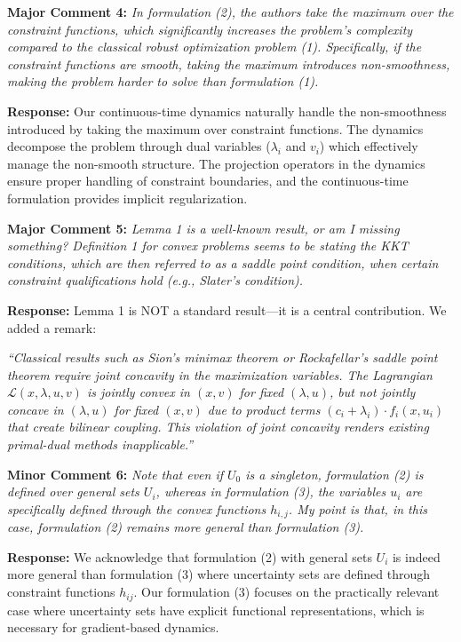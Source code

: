 \documentclass[journal,twoside,web]{ieeecolor}
\begin{document}
\vspace{0.5em}
\noindent\textbf{Major Comment 4:} \textit{In formulation (2), the authors take the maximum over the constraint functions, which significantly increases the problem's complexity compared to the classical robust optimization problem (1). Specifically, if the constraint functions are smooth, taking the maximum introduces non-smoothness, making the problem harder to solve than formulation (1).}

\noindent\textbf{Response:} Our continuous-time dynamics naturally handle the non-smoothness introduced by taking the maximum over constraint functions. The dynamics decompose the problem through dual variables ($\lambda_i$ and $v_i$) which effectively manage the non-smooth structure. The projection operators in the dynamics ensure proper handling of constraint boundaries, and the continuous-time formulation provides implicit regularization.

\vspace{0.5em}
\noindent\textbf{Major Comment 5:} \textit{Lemma 1 is a well-known result, or am I missing something? Definition 1 for convex problems seems to be stating the KKT conditions, which are then referred to as a saddle point condition, when certain constraint qualifications hold (e.g., Slater's condition).}

\noindent\textbf{Response:} Lemma 1 is NOT a standard result---it is a central contribution. We added a remark:

{\color{revisionblue}\textit{``Classical results such as Sion's minimax theorem or Rockafellar's saddle point theorem require joint concavity in the maximization variables. The Lagrangian $\mathcal{L}(x,\lambda,u,v)$ is jointly convex in $(x,v)$ for fixed $(\lambda,u)$, but not jointly concave in $(\lambda,u)$ for fixed $(x,v)$ due to product terms $(c_i+\lambda_i) \cdot f_i(x,u_i)$ that create bilinear coupling. This violation of joint concavity renders existing primal-dual methods inapplicable.''}}

\vspace{0.5em}
\noindent\textbf{Minor Comment 6:} \textit{Note that even if $U_0$ is a singleton, formulation (2) is defined over general sets $U_i$, whereas in formulation (3), the variables $u_i$ are specifically defined through the convex functions $h_{i,j}$. My point is that, in this case, formulation (2) remains more general than formulation (3).}

\noindent\textbf{Response:} We acknowledge that formulation (2) with general sets $U_i$ is indeed more general than formulation (3) where uncertainty sets are defined through constraint functions $h_{ij}$. Our formulation (3) focuses on the practically relevant case where uncertainty sets have explicit functional representations, which is necessary for gradient-based dynamics.
\end{document}
